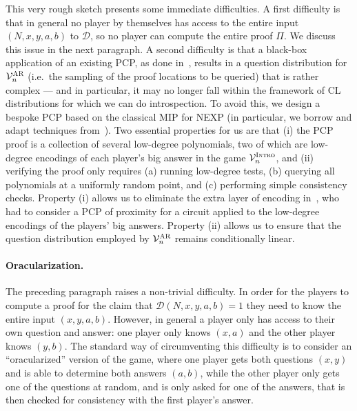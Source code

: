 \documentclass[11pt]{article}
\theoremstyle{definition}
\newcommand{\decider}{\mathcal{D}}
\newcommand{\verifier}{\mathcal{V}}
\newcommand{\gamestyle}[1]{\ensuremath{\textsc{#1}}\xspace}
\newcommand{\ar}{\gamestyle{AR}}
\newcommand{\intro}{\gamestyle{Intro}}
\newcommand{\anote}[1]{}
\begin{document}
This very rough sketch presents some immediate difficulties. A first difficulty is that in general no player by themselves has access to the entire input $(N,x,y,a,b)$ to $\decider$, so no player can compute the entire proof $\Pi$. We discuss this issue in the next paragraph. A second difficulty is that a black-box application of an existing PCP, as done in~\cite{NW19}, results in a question distribution for $\verifier_n^\ar$ (i.e.\ the sampling of the proof locations to be queried) that is rather complex --- and in particular, it may no longer fall within the framework of CL distributions for which we can do introspection. 
To avoid this, we design a bespoke PCP based on the classical MIP for NEXP (in particular, we borrow and adapt techniques from~\cite{ben2005simple,ben2006robust}). Two essential properties for us are that (i) the PCP proof is a collection of several low-degree polynomials,
    two of which are low-degree encodings of each player's big answer in the game $\verifier^\intro_n$, and (ii) verifying the proof only requires (a) running low-degree tests, (b) querying all polynomials at a uniformly random point, and (c) performing simple consistency checks. Property (i) allows us to eliminate the extra layer of encoding in~\cite{NW19}, who had to consider a PCP of proximity for a circuit applied to the
low-degree encodings of the players' big answers. Property (ii) allows us to ensure that the question distribution employed by $\verifier_n^\ar$ remains conditionally linear. \anote{should we mention testing the input/PCPPs here?}

\paragraph{Oracularization.}
The preceding paragraph raises a non-trivial difficulty. In order for the players to compute a proof for the claim that $\decider(N,x,y,a,b)=1$ they need to know the entire input $(x,y,a,b)$. However, in general a player only has access to their own question and answer: one player only knows $(x,a)$ and the other player knows $(y,b)$. The standard way of circumventing this difficulty is to consider an ``oracularized'' version of the game, where one player gets both questions $(x,y)$ and is able to determine both answers $(a,b)$, while the other player only gets one of the questions at random, and is only asked for one of the answers, that is then checked for consistency with the first player's answer. 
\end{document}
